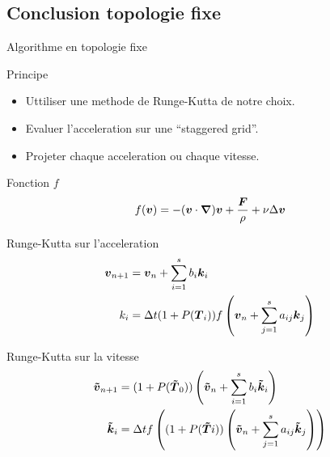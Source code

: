 \subsection{Conclusion topologie fixe}
\begin{frame}[shrink]{Algorithme en topologie fixe}
 \begin{block}{Principe}
  \begin{itemize}
   \item Uttiliser une methode de Runge-Kutta de notre choix.
   \item Evaluer l'acceleration sur une ``staggered grid''.
   \item Projeter chaque acceleration ou chaque vitesse.
  \end{itemize}
 \end{block}
 \begin{block}{Fonction $f$}
 \vspace{-0.5cm}
 \begin{equation*}
  f({\boldsymbol {v}})=-({\boldsymbol {v}}\cdot{\boldsymbol {\nabla}} ) {\boldsymbol {v}}+\frac{{\boldsymbol {F}}}{\rho}+\nu \Delta {\boldsymbol {v}}
  \end{equation*}
 \end{block}

\begin{block}{Runge-Kutta sur l'acceleration}
 \vspace{-0.7cm}
	\begin{align*}
	{\boldsymbol {v}}_{n+1}&={\boldsymbol {v}}_{n}+\sum_{i=1}^{s}b_{i}{\boldsymbol {k}}_{i}\\
	k_{i}&=\Delta t (1+P({\boldsymbol {T}}_{i}))f\left({\boldsymbol {v}}_{n}+\sum_{j=1}^{s}a_{ij}{\boldsymbol {k}}_{j}\right)
	\end{align*}
\end{block}
 
\begin{block}{Runge-Kutta sur la vitesse}
 \vspace{-0.5cm}
	\begin{align*}
	{\boldsymbol {\tilde{v}}}_{n+1}&=(1+P({\boldsymbol {\tilde{T}}}_0))\left({\boldsymbol {\tilde{v}}}_{n}+\sum_{i=1}^{s}b_{i}{\boldsymbol {\tilde{k}}}_{i}\right)\\
	{\boldsymbol {\tilde{k}}}_{i}&=\Delta t f\left((1+P({\boldsymbol {\tilde{T}}}{i}))\left({\boldsymbol {\tilde{v}}}_{n}+\sum_{j=1}^{s}a_{ij}{\boldsymbol {\tilde{k}}}_{j}\right)\right)
	\end{align*}
\end{block}
\end{frame}

